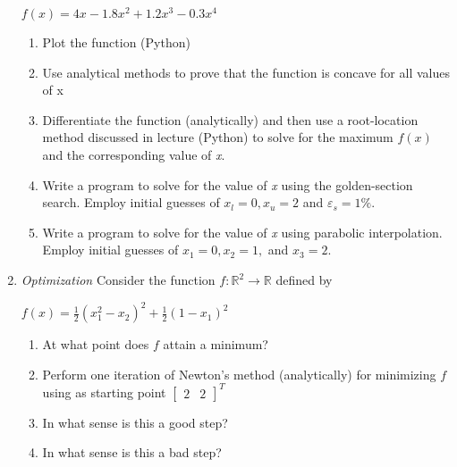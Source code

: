 \documentclass[11pt]{article}
\begin{document}
\begin{enumerate}
        \begin{center} 
        $f(x)=4x-1.8x^2+1.2x^3-0.3x^4$ 
        \end{center}
	\begin{enumerate}
		\item Plot the function (Python)
		\item Use analytical methods to prove that the function is concave for all values of x
		\item Differentiate the function (analytically) and then use a root-location method discussed in lecture (Python) to solve for the maximum $f(x)$ and the corresponding value of \textit{x}.
		\item Write a program to solve for the value of \textit{x} using the golden-section search. Employ initial guesses of $x_l=0, x_u=2$ and $\varepsilon_s=1\%$. 
		\item Write a program to solve for the value of \textit{x} using parabolic interpolation. Employ initial guesses of $x_1=0, x_2=1,$ and $x_3=2$.
	\end{enumerate}

    \item \textit{Optimization} Consider the function $f:\mathbb{R}^2 \rightarrow \mathbb{R}$ defined by
        \begin{center}
            $f(x)=\frac{1}{2}(x_1^2 - x_2)^2 + \frac{1}{2}(1-x_1)^2$
        \end{center}
        \begin{enumerate}
            \item At what point does $f$ attain a minimum?
            \item Perform one iteration of Newton's method (analytically) for minimizing $f$ using as starting point $\begin{bmatrix} 2 & 2 \end{bmatrix}^T$
        \item In what sense is this a good step?
        \item In what sense is this a bad step?
        \end{enumerate}
\end{enumerate}
\end{document}
